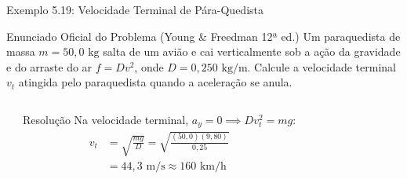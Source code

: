 \documentclass[10pt,aspectratio=169]{beamer}
\begin{document}
\begin{frame}{Exemplo 5.19: Velocidade Terminal de Pára-Quedista}
    \begin{block}{Enunciado Oficial do Problema (Young \& Freedman 12ª ed.)}
        \small
        Um paraquedista de massa $m = 50{,}0\text{ kg}$ salta de um avião e cai verticalmente sob a ação da gravidade e do arraste do ar $f = D v^2$, onde $D = 0{,}250\text{ kg/m}$. Calcule a velocidade terminal $v_t$ atingida pelo paraquedista quando a aceleração se anula.
    \end{block}
    \begin{columns}[T]
        \begin{center}
        \end{center}
        \begin{exampleblock}{Resolução}
            \small
            Na velocidade terminal, $a_y = 0 \implies D v_t^2 = mg$:
            \begin{align*}
                v_t &= \sqrt{\frac{mg}{D}} = \sqrt{\frac{(50{,}0)(9{,}80)}{0{,}25}} \\
                    &= 44{,}3\text{ m/s} \approx 160\text{ km/h}
            \end{align*}
        \end{exampleblock}
    \end{columns}
\end{frame}
\end{document}
